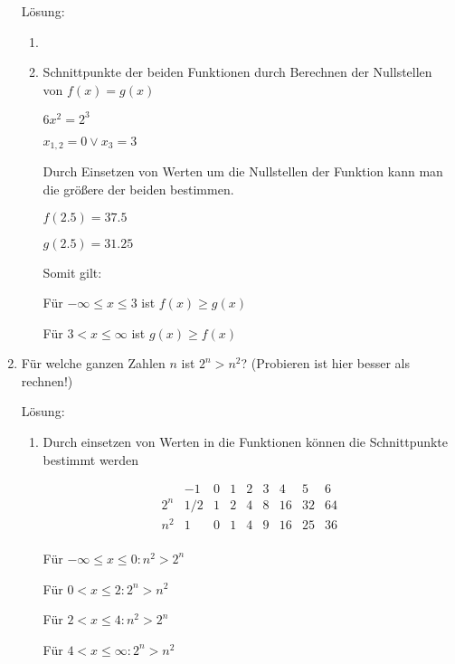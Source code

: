 \documentclass[main.tex]{subfiles}
\begin{document}
\begin{enumerate}
	      Lösung:
	      \begin{enumerate}
		      \item
		      \item Schnittpunkte der beiden Funktionen durch Berechnen
		            der Nullstellen von \( f(x) = g(x) \)

		            \( 6x^2 = 2^3 \)

		            \( x_{1,2} = 0 \lor x_3 = 3 \)

		            Durch Einsetzen von Werten um die Nullstellen der Funktion kann man die größere der
		            beiden bestimmen.

		            \( f(2.5) = 37.5 \)

		            \( g(2.5) = 31.25\)

		            Somit gilt:

		            Für \( -\infty \leq x \leq 3 \) ist \( f(x) \geq g(x) \)

		            Für \( 3 < x \leq \infty \) ist \( g(x) \geq f(x) \)
	      \end{enumerate}
	\item Für welche ganzen Zahlen \( n \) ist \( 2^n > n^2 \)?
	      (Probieren ist hier besser als rechnen!)

	      Lösung:
	      \begin{enumerate}
		      \item Durch einsetzen von Werten in die Funktionen können die Schnittpunkte bestimmt werden

		            \[ \begin{array}{c|cccccccc}
				                & -1    & 0 & 1 & 2 & 3 & 4  & 5  & 6  \\
				            \hline
				            2^n & 1 / 2 & 1 & 2 & 4 & 8 & 16 & 32 & 64 \\
				            n^2 & 1     & 0 & 1 & 4 & 9 & 16 & 25 & 36 \\
			            \end{array} \]

		            Für \( -\infty \leq x \leq 0 : n^2 > 2^n \)

		            Für \( 0 < x \leq 2 : 2^n > n^2 \)

		            Für \( 2 < x \leq 4 : n^2 > 2^n \)

		            Für \( 4 < x \leq \infty : 2^n > n^2 \)


\end{enumerate}
\end{enumerate}
\end{document}

